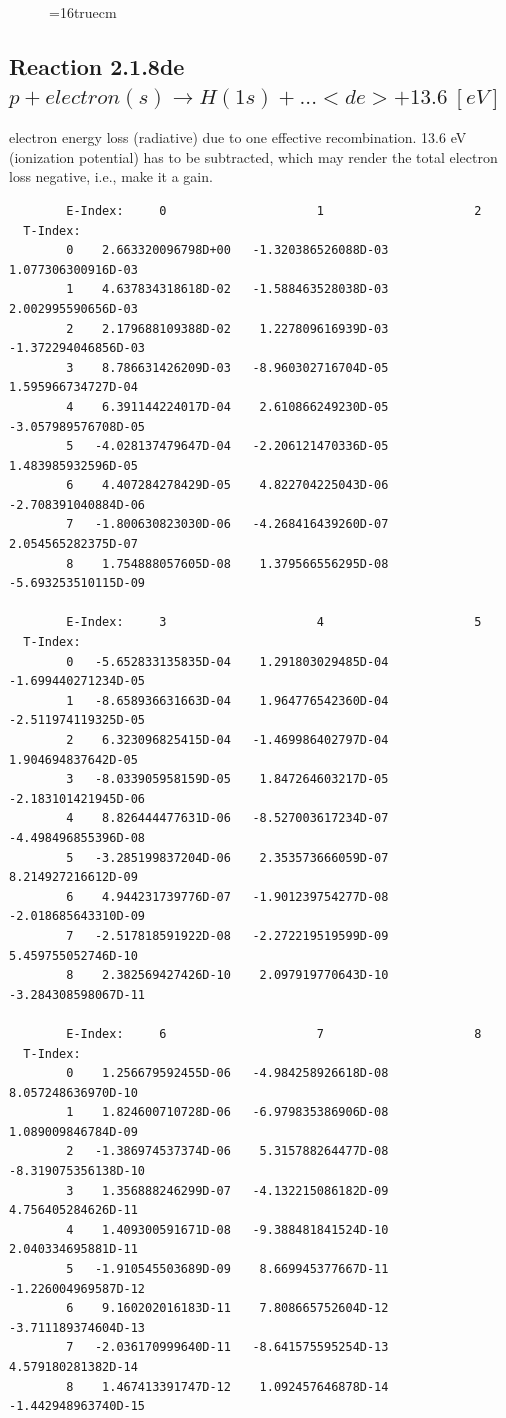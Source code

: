 \documentclass[12pt,dvips]{article}
\begin{document}
\begin{figure} \label{2.1.8rtot}
\epsfxsize=16truecm
\end{figure}
\newpage



\subsection{
  Reaction 2.1.8de $p + electron(s) \rightarrow H(1s) + ...   <de>+13.6 \ [eV] $
}

  electron energy loss (radiative) due to one effective recombination.
  13.6 eV (ionization potential) has to be
  subtracted, which may render the total electron loss negative, i.e., make it a gain.

\begin{small}\begin{verbatim}
        E-Index:     0                     1                     2
  T-Index:
        0    2.663320096798D+00   -1.320386526088D-03    1.077306300916D-03
        1    4.637834318618D-02   -1.588463528038D-03    2.002995590656D-03
        2    2.179688109388D-02    1.227809616939D-03   -1.372294046856D-03
        3    8.786631426209D-03   -8.960302716704D-05    1.595966734727D-04
        4    6.391144224017D-04    2.610866249230D-05   -3.057989576708D-05
        5   -4.028137479647D-04   -2.206121470336D-05    1.483985932596D-05
        6    4.407284278429D-05    4.822704225043D-06   -2.708391040884D-06
        7   -1.800630823030D-06   -4.268416439260D-07    2.054565282375D-07
        8    1.754888057605D-08    1.379566556295D-08   -5.693253510115D-09

        E-Index:     3                     4                     5
  T-Index:
        0   -5.652833135835D-04    1.291803029485D-04   -1.699440271234D-05
        1   -8.658936631663D-04    1.964776542360D-04   -2.511974119325D-05
        2    6.323096825415D-04   -1.469986402797D-04    1.904694837642D-05
        3   -8.033905958159D-05    1.847264603217D-05   -2.183101421945D-06
        4    8.826444477631D-06   -8.527003617234D-07   -4.498496855396D-08
        5   -3.285199837204D-06    2.353573666059D-07    8.214927216612D-09
        6    4.944231739776D-07   -1.901239754277D-08   -2.018685643310D-09
        7   -2.517818591922D-08   -2.272219519599D-09    5.459755052746D-10
        8    2.382569427426D-10    2.097919770643D-10   -3.284308598067D-11

        E-Index:     6                     7                     8
  T-Index:
        0    1.256679592455D-06   -4.984258926618D-08    8.057248636970D-10
        1    1.824600710728D-06   -6.979835386906D-08    1.089009846784D-09
        2   -1.386974537374D-06    5.315788264477D-08   -8.319075356138D-10
        3    1.356888246299D-07   -4.132215086182D-09    4.756405284626D-11
        4    1.409300591671D-08   -9.388481841524D-10    2.040334695881D-11
        5   -1.910545503689D-09    8.669945377667D-11   -1.226004969587D-12
        6    9.160202016183D-11    7.808665752604D-12   -3.711189374604D-13
        7   -2.036170999640D-11   -8.641575595254D-13    4.579180281382D-14
        8    1.467413391747D-12    1.092457646878D-14   -1.442948963740D-15


\end{verbatim}
\end{small}
\end{document}
